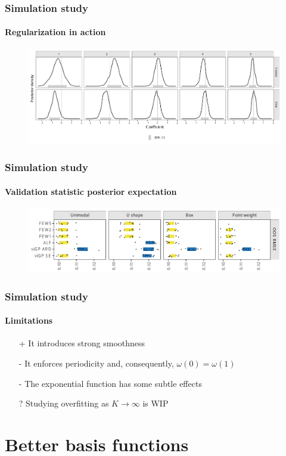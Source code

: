 \documentclass[handout]{snedecorbeamer}
\begin{document}
\begin{frame}[c]
  \frametitle{Simulation study}
  \framesubtitle{Regularization in action}

  \begin{figure}
    \centering
    \includegraphics[width=\textwidth]{syn01-weightFun1-param-1}
  \end{figure}
\end{frame}

\begin{frame}[c]
  \frametitle{Simulation study}
  \framesubtitle{Validation statistic posterior expectation}

  \begin{figure}
    \centering
    \includegraphics[width=\textwidth]{syn01-validation-fig-mini}
  \end{figure}
\end{frame}

\begin{frame}
  \frametitle{Simulation study}
  \framesubtitle{Limitations}

  \begin{itemize}
  \item[+] It introduces strong smoothness
  \item[-] It enforces periodicity and, consequently, $\omega(0) = \omega(1)$
  \item[-] The exponential function has some subtle effects
  \item[?] Studying overfitting as $K\to\infty$ is WIP
  \end{itemize}
\end{frame}

\section{Better basis functions}
\end{document}
